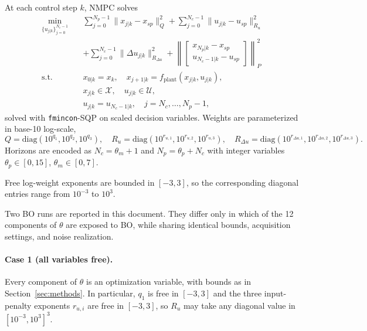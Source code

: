 \documentclass[11pt,a4paper]{article}
\newcommand{\Nc}{N_c}
\newcommand{\Np}{N_p}
\begin{document}
At each control step $k$, NMPC solves
\begin{align}
\min_{\{u_{j|k}\}_{j=0}^{\Nc-1}} \quad &
\sum_{j=0}^{\Np-1}\|x_{j|k}-x_{sp}\|_{Q}^2
+ \sum_{j=0}^{\Nc-1}\|u_{j|k}-u_{sp}\|_{R_u}^2 \nonumber\\
&+ \sum_{j=0}^{\Nc-1}\|\Delta u_{j|k}\|_{R_{\Delta u}}^2
+ \left\|\begin{bmatrix} x_{\Np|k}-x_{sp}\\ u_{\Nc-1|k}-u_{sp}\end{bmatrix}\right\|_{P}^2 \\
\text{s.t.}\quad &
x_{0|k}=x_k,\quad x_{j+1|k}=f_{\mathrm{plant}}(x_{j|k},u_{j|k}), \nonumber\\
& x_{j|k}\in\mathcal{X},\quad u_{j|k}\in\mathcal{U}, \nonumber\\
& u_{j|k}=u_{\Nc-1|k},\quad j=\Nc,\ldots,\Np-1, \nonumber
\end{align}
solved with \texttt{fmincon}-SQP on scaled decision variables. Weights are parameterized in base-10 log-scale,
\begin{equation}
Q = \mathrm{diag}(10^{q_1}, 10^{q_2}, 10^{q_3}), \quad
R_u = \mathrm{diag}(10^{r_{u,1}}, 10^{r_{u,2}}, 10^{r_{u,3}}), \quad
R_{\Delta u} = \mathrm{diag}(10^{r_{\Delta u,1}}, 10^{r_{\Delta u,2}}, 10^{r_{\Delta u,3}}).
\end{equation}
Horizons are encoded as $\Nc = \theta_m + 1$ and $\Np = \theta_p + \Nc$ with integer variables $\theta_p \in [0, 15]$, $\theta_m \in [0, 7]$.

Free log-weight exponents are bounded in $[-3,3]$, so the corresponding diagonal entries range from $10^{-3}$ to $10^3$.

Two BO runs are reported in this document. They differ only in which of the 12 components of $\theta$ are exposed to BO, while sharing identical bounds, acquisition settings, and noise realization.
\paragraph{Case 1 (all variables free).} Every component of $\theta$ is an optimization variable, with bounds as in Section~\ref{sec:methods}. In particular, $q_1$ is free in $[-3, 3]$ and the three input-penalty exponents $r_{u,i}$ are free in $[-3, 3]$, so $R_u$ may take any diagonal value in $[10^{-3}, 10^3]^3$.
\end{document}
